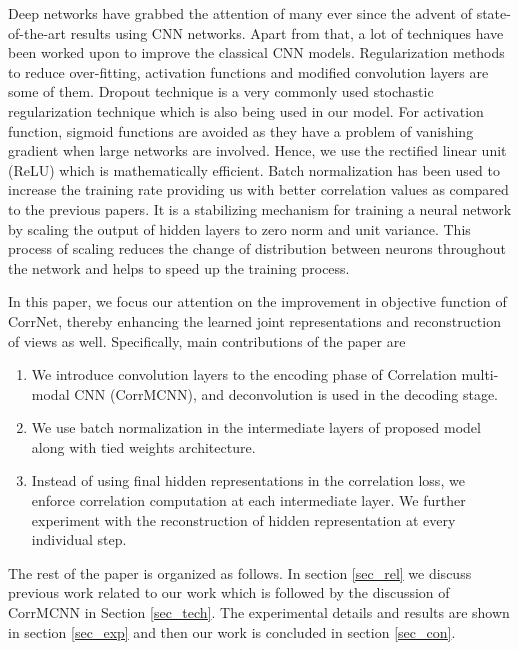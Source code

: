 \documentclass[10pt, a4paper, conference, compsocconf]{IEEEtran}
\begin{document}
Deep networks have grabbed the attention of many ever since the advent of state-of-the-art results using CNN networks. Apart from that, a lot of techniques have been worked upon to improve the classical CNN models. Regularization methods to reduce over-fitting, activation functions and modified convolution layers are some of them. Dropout technique \cite{hinton2012improving_dropout} is a very commonly used stochastic regularization technique which is also being used in our model. For activation function, sigmoid functions are avoided as they have a problem of vanishing gradient when large networks are involved. Hence, we use the rectified linear unit (ReLU) \cite{nair2010rectified} which is mathematically efficient. Batch normalization \cite{ioffe2015batch} has been used to increase the training rate providing us with better correlation values as compared to the previous papers. It is a stabilizing mechanism for training a neural network by scaling the output of hidden layers to zero norm and unit variance. This process of scaling reduces the change of distribution between neurons throughout the network and helps to speed up the training process.

In this paper, we focus our attention on the improvement in objective function of CorrNet, thereby enhancing the learned joint representations and reconstruction of views as well. Specifically, main contributions of the paper are
\begin{enumerate}
\item We introduce convolution layers to the encoding phase of Correlation multi-modal CNN (CorrMCNN), and deconvolution is used in the decoding stage.
\item We use batch normalization in the intermediate layers of proposed model along with tied weights architecture.
% 
% 
\item Instead of using final hidden representations in the correlation loss, we enforce correlation computation at each intermediate layer. We further experiment with the reconstruction of hidden representation at every individual step.
\end{enumerate}

The rest of the paper is organized as follows. In section \ref{sec_rel} we discuss previous work related to our work which is followed by the discussion of CorrMCNN in Section \ref{sec_tech}. The experimental details and results are shown in section \ref{sec_exp} and then our work is concluded in section \ref{sec_con}.
\end{document}

